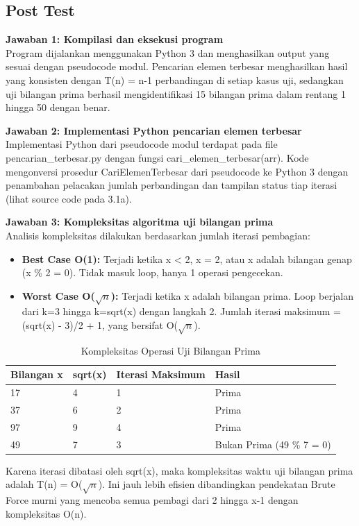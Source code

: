 \subsection{Post Test}

\textbf{Jawaban 1: Kompilasi dan eksekusi program}\\
Program dijalankan menggunakan Python 3 dan menghasilkan output yang sesuai dengan pseudocode modul. Pencarian elemen terbesar menghasilkan hasil yang konsisten dengan T(n) = n-1 perbandingan di setiap kasus uji, sedangkan uji bilangan prima berhasil mengidentifikasi 15 bilangan prima dalam rentang 1 hingga 50 dengan benar.

\textbf{Jawaban 2: Implementasi Python pencarian elemen terbesar}\\
Implementasi Python dari pseudocode modul terdapat pada file pencarian\_terbesar.py dengan fungsi cari\_elemen\_terbesar(arr). Kode mengonversi prosedur CariElemenTerbesar dari pseudocode ke Python 3 dengan penambahan pelacakan jumlah perbandingan dan tampilan status tiap iterasi (lihat source code pada 3.1a).

\textbf{Jawaban 3: Kompleksitas algoritma uji bilangan prima}\\
Analisis kompleksitas dilakukan berdasarkan jumlah iterasi pembagian:
\begin{itemize}
    \item \textbf{Best Case O(1):} Terjadi ketika x < 2, x = 2, atau x adalah bilangan genap (x \% 2 = 0). Tidak masuk loop, hanya 1 operasi pengecekan.
    \item \textbf{Worst Case O($\sqrt{n}$):} Terjadi ketika x adalah bilangan prima. Loop berjalan dari k=3 hingga k=sqrt(x) dengan langkah 2. Jumlah iterasi maksimum = (sqrt(x) - 3)/2 + 1, yang bersifat O($\sqrt{n}$).
\end{itemize}

\begin{table}[H]
    \centering
    \caption{Kompleksitas Operasi Uji Bilangan Prima}
    \label{tab:kompleksitas_prima}
    \begin{tabular}{llll}
    \toprule
    \textbf{Bilangan x} & \textbf{sqrt(x)} & \textbf{Iterasi Maksimum} & \textbf{Hasil} \\ \midrule
    17 & 4 & 1 & Prima \\
    37 & 6 & 2 & Prima \\
    97 & 9 & 4 & Prima \\
    49 & 7 & 3 & Bukan Prima (49 \% 7 = 0) \\ \bottomrule
    \end{tabular}
\end{table}

Karena iterasi dibatasi oleh sqrt(x), maka kompleksitas waktu uji bilangan prima adalah T(n) = O($\sqrt{n}$). Ini jauh lebih efisien dibandingkan pendekatan Brute Force murni yang mencoba semua pembagi dari 2 hingga x-1 dengan kompleksitas O(n).